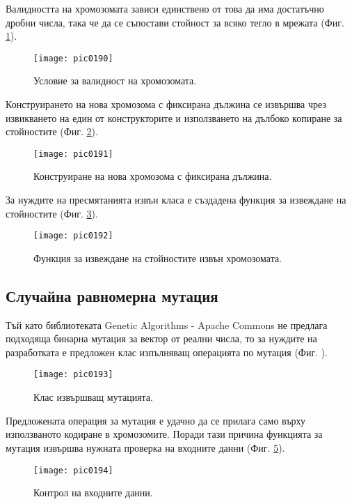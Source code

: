 Валидността на хромозомата зависи единствено от това да има достатъчно дробни числа, така че да се съпостави стойност за всяко тегло в мрежата (Фиг. \ref{fig:pic0190}).

\begin{figure}[h]
  \centering
  \texttt{[image: pic0190]}
  \caption{Условие за валидност на хромозомата.}
\label{fig:pic0190}
\end{figure}
\FloatBarrier

Конструирането на нова хромозома с фиксирана дължина се извършва чрез извикването на един от конструкторите и използването на дълбоко копиране за стойностите (Фиг. \ref{fig:pic0191}).

\begin{figure}[h]
  \centering
  \texttt{[image: pic0191]}
  \caption{Конструиране на нова хромозома с фиксирана дължина.}
\label{fig:pic0191}
\end{figure}
\FloatBarrier

За нуждите на пресмятанията извън класа е създадена функция за извеждане на стойностите (Фиг. \ref{fig:pic0192}).

\begin{figure}[h]
  \centering
  \texttt{[image: pic0192]}
  \caption{Функция за извеждане на стойностите извън хромозомата.}
\label{fig:pic0192}
\end{figure}
\FloatBarrier

\subsection{Случайна равномерна мутация}

Тъй като библиотеката Genetic Algorithms - Apache Commons не предлага подходяща бинарна мутация за вектор от реални числа, то за нуждите на разработката е предложен клас изпълняващ операцията по мутация (Фиг. ).

\begin{figure}[h]
  \centering
  \texttt{[image: pic0193]}
  \caption{Клас извършващ мутацията.}
\label{fig:pic0193}
\end{figure}
\FloatBarrier

Предложената операция за мутация е удачно да се прилага само върху използваното кодиране в хромозомите. Поради тази причина функцията за мутация извършва нужната проверка на входните данни (Фиг. \ref{fig:pic0194}).

\begin{figure}[h]
  \centering
  \texttt{[image: pic0194]}
  \caption{Контрол на входните данни.}
\label{fig:pic0194}
\end{figure}
\FloatBarrier

